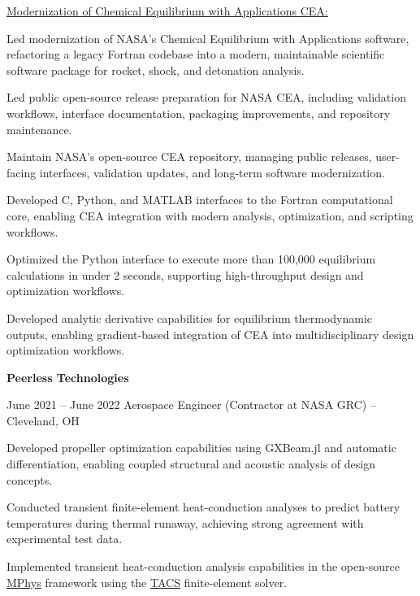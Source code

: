 \underline{Modernization of Chemical Equilibrium with Applications \href{https://github.com/nasa/cea}{CEA}:}
\begin{onecolentry}
    \begin{highlights}
        \item Led modernization of NASA’s Chemical Equilibrium with Applications software, refactoring a legacy Fortran codebase into a modern, maintainable scientific software package for rocket, shock, and detonation analysis.
        \item Led public open-source release preparation for NASA CEA, including validation workflows, interface documentation, packaging improvements, and repository maintenance.
        \item Maintain NASA's open-source CEA repository, managing public releases, user-facing interfaces, validation updates, and long-term software modernization.
        \item Developed C, Python, and MATLAB interfaces to the Fortran computational core, enabling CEA integration with modern analysis, optimization, and scripting workflows.
        \item Optimized the Python interface to execute more than 100,000 equilibrium calculations in under 2 seconds, supporting high-throughput design and optimization workflows.
        \item Developed analytic derivative capabilities for equilibrium thermodynamic outputs, enabling gradient-based integration of CEA into multidisciplinary design optimization workflows.
    \end{highlights}
\end{onecolentry}

\vspace{0.2cm}

\textbf{Peerless Technologies}
\begin{twocolentry}{June 2021 -- June 2022}
    Aerospace Engineer (Contractor at NASA GRC) -- Cleveland, OH
\end{twocolentry}

\vspace{0.10cm}
\begin{onecolentry}
    \begin{highlights}
        \item Developed propeller optimization capabilities using GXBeam.jl and automatic differentiation, enabling coupled structural and acoustic analysis of design concepts.
        \item Conducted transient finite-element heat-conduction analyses to predict battery temperatures during thermal runaway, achieving strong agreement with experimental test data.
        \item Implemented transient heat-conduction analysis capabilities in the open-source \href{https://github.com/OpenMDAO/mphys}{MPhys} framework using the \href{https://github.com/smdogroup/tacs}{TACS} finite-element solver.
    \end{highlights}
\end{onecolentry}

